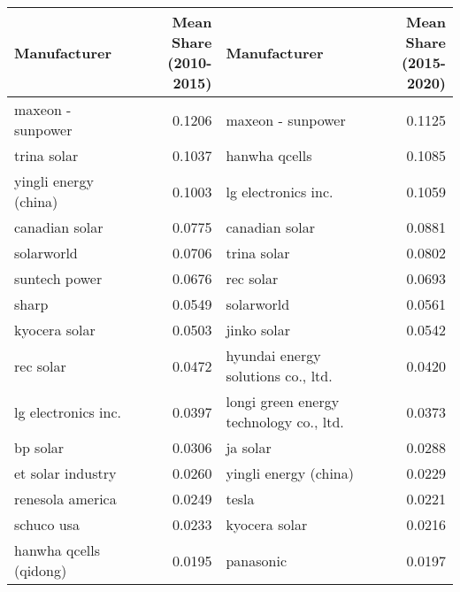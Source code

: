 \begin{table}[!t]
\fontsize{12.0pt}{14.4pt}\selectfont
\begin{tabular*}{\linewidth}{@{\extracolsep{\fill}}lrlr}
\toprule
Manufacturer & Mean Share (2010-2015) & Manufacturer & Mean Share (2015-2020) \\ 
\midrule\addlinespace[2.5pt]
maxeon - sunpower & 0.1206 & maxeon - sunpower & 0.1125 \\ 
trina solar & 0.1037 & hanwha qcells & 0.1085 \\ 
yingli energy (china) & 0.1003 & lg electronics inc. & 0.1059 \\ 
canadian solar & 0.0775 & canadian solar & 0.0881 \\ 
solarworld & 0.0706 & trina solar & 0.0802 \\ 
suntech power & 0.0676 & rec solar & 0.0693 \\ 
sharp & 0.0549 & solarworld & 0.0561 \\ 
kyocera solar & 0.0503 & jinko solar & 0.0542 \\ 
rec solar & 0.0472 & hyundai energy solutions co., ltd. & 0.0420 \\ 
lg electronics inc. & 0.0397 & longi green energy technology co., ltd. & 0.0373 \\ 
bp solar & 0.0306 & ja solar & 0.0288 \\ 
et solar industry & 0.0260 & yingli energy (china) & 0.0229 \\ 
renesola america & 0.0249 & tesla & 0.0221 \\ 
schuco usa & 0.0233 & kyocera solar & 0.0216 \\ 
hanwha qcells (qidong) & 0.0195 & panasonic & 0.0197 \\ 
\bottomrule
\end{tabular*}
\end{table}
